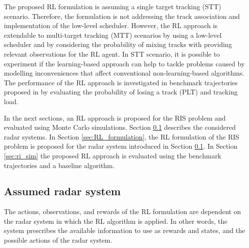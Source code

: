 \documentclass[english, 12pt, a4paper, elec, utf8, a-1b, online]{aaltothesis}
\begin{document}
The proposed RL formulation is assuming a single target tracking (STT) scenario. 
Therefore, the formulation is not addressing the track association and implementation of the low-level scheduler.
However, the RL approach is extendable to multi-target tracking (MTT) scenarios by using a low-level scheduler and by considering the probability of mixing tracks with providing relevant observations for the RL agent.
In STT scenario, it is possible to experiment if the learning-based approach can help to tackle problems caused by modelling inconveniences that affect conventional non-learning-based algorithms.
The performance of the RL approach is investigated in benchmark trajectories proposed in \cite{Blair1998} by evaluating the probability of losing a track (PLT) and tracking load.

In the next sections, an RL approach is proposed for the RIS problem and evaluated using Monte Carlo simulations.
Section \ref{sec:system_description} describes the considered radar systems.
In Section \ref{sec:RL_formulation}, the RL formulation of the RIS problem is proposed for the radar system introduced in Section \ref{sec:system_description}.
In Section \ref{sec:ri_sim} the proposed RL approach is evaluated using the benchmark trajectories and a baseline algorithm.


\subsection{Assumed radar system} \label{sec:system_description}

The actions, observations, and rewards of the RL formulation are dependent on the radar system in which the RL algorithm is applied.
In other words, the system prescribes the available information to use as rewards and states, and the possible actions of the radar system.
\end{document}
